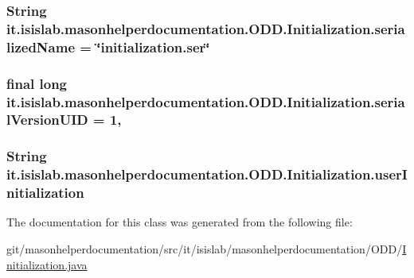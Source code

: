 \hypertarget{classit_1_1isislab_1_1masonhelperdocumentation_1_1_o_d_d_1_1_initialization_afef56cc7d44cf777469fb0e4b1573b3f}{
\subsubsection[{serialized\-Name}]{\setlength{\rightskip}{0pt plus 5cm}String it.\-isislab.\-masonhelperdocumentation.\-O\-D\-D.\-Initialization.\-serialized\-Name = \char`\"{}initialization.\-ser\char`\"{}\hspace{0.3cm}{\ttfamily [static]}}}\label{classit_1_1isislab_1_1masonhelperdocumentation_1_1_o_d_d_1_1_initialization_afef56cc7d44cf777469fb0e4b1573b3f}
\hypertarget{classit_1_1isislab_1_1masonhelperdocumentation_1_1_o_d_d_1_1_initialization_a1488698b7971d931a111d6d471de3c1f}{
\subsubsection[{serial\-Version\-U\-I\-D}]{\setlength{\rightskip}{0pt plus 5cm}final long it.\-isislab.\-masonhelperdocumentation.\-O\-D\-D.\-Initialization.\-serial\-Version\-U\-I\-D = 1\hspace{0.3cm}{\ttfamily [static]}, {\ttfamily [private]}}}\label{classit_1_1isislab_1_1masonhelperdocumentation_1_1_o_d_d_1_1_initialization_a1488698b7971d931a111d6d471de3c1f}
\hypertarget{classit_1_1isislab_1_1masonhelperdocumentation_1_1_o_d_d_1_1_initialization_ab6f374af9cc4feec7d5eae7cf16c22e3}{
\subsubsection[{user\-Initialization}]{\setlength{\rightskip}{0pt plus 5cm}String it.\-isislab.\-masonhelperdocumentation.\-O\-D\-D.\-Initialization.\-user\-Initialization\hspace{0.3cm}{\ttfamily [package]}}}\label{classit_1_1isislab_1_1masonhelperdocumentation_1_1_o_d_d_1_1_initialization_ab6f374af9cc4feec7d5eae7cf16c22e3}


The documentation for this class was generated from the following file\-:\begin{DoxyCompactItemize}
\item 
git/masonhelperdocumentation/src/it/isislab/masonhelperdocumentation/\-O\-D\-D/\hyperlink{_initialization_8java}{Initialization.\-java}\end{DoxyCompactItemize}
